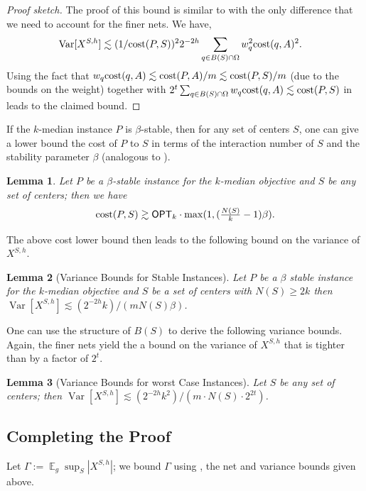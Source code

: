 \documentclass[11pt]{article}
\newtheorem{lemma}{Lemma}[section]
\theoremstyle{restate}
\theoremstyle{definition}
\DeclareMathOperator*{\var}{\mathrm{Var}}
\newcommand{\E}{\mathop{\mathbb{E}}}
\newcommand{\cost}{\textnormal{cost}}
\newcommand{\opt}{\ensuremath{\mathsf{OPT}}}
\newcommand{\ccint}{N} %
\begin{document}
\begin{proof}[Proof sketch]
The proof of this bound is similar to  with the only difference that we need to account for the finer nets. We have,
\begin{align}\label{eq: var-1-kmedian}
    \var[X^{S,h}]&\lesssim (1/\cost(P,S))^2 2^{-2h}  \sum_{q \in B(S) \cap \Omega } w_q^2 \cost(q,A)^2.
\end{align}
Using the fact that $w_q \cost(q,A) \lesssim \cost(P,A)/m \lesssim \cost(P,S)/m$ (due to the bounds on the weight) together with $2^t \sum_{q \in B(S) \cap \Omega }  w_{q} \cost(q,A) \lesssim  \cost(P,S)$ in  leads to the claimed bound.\qedhere
\end{proof}

If the $k$-median instance $P$ is $\beta$-stable, then for any set of centers $S$, one can give a lower bound the cost of $P$ to $S$ in terms of the interaction number of $S$ and the stability parameter $\beta$ (analogous to ). 
\begin{lemma}\label{lem: cost-increase-kmedian}
	Let $P$ be a $\beta$-stable instance for the $k$-median objective and $S$ be any set of centers; then we have  $$\cost(P,S) \gtrsim  \opt_k \cdot \max(1,  (\tfrac{\ccint(S)}{k} - 1) \beta).$$ 
\end{lemma}

The above cost lower bound then leads to the following bound on the variance of $X^{S,h}$.
\begin{lemma}[Variance Bounds for Stable Instances]\label{lem: var-stable-kmedian} Let $P$ be a $\beta$ stable instance for the $k$-median objective and $S$ be a set of centers with $N(S) \geq 2k$ then $\var[X^{S,h}] \lesssim (2^{-2h} k)/(m N(S) \beta)$.
\end{lemma}

One can use the structure of $B(S)$ to derive the following variance bounds. Again, the finer nets yield the a bound on the variance of $X^{S,h}$ that is tighter than  by a factor of $2^t$.
\begin{lemma}[Variance Bounds for worst Case Instances]\label{lem: var-worst-case-kmedian}
Let $S$ be any set of centers; then  $\var[X^{S,h}] \lesssim (2^{-2h}k^2)/(m \cdot N(S) \cdot 2^{2t})$.
\end{lemma}

\subsection{Completing the Proof}
Let $\Gamma := \E_g \sup_S |X^{S,h}|$; we bound $\Gamma$ using ,  the net and variance bounds given above.
\end{document}
